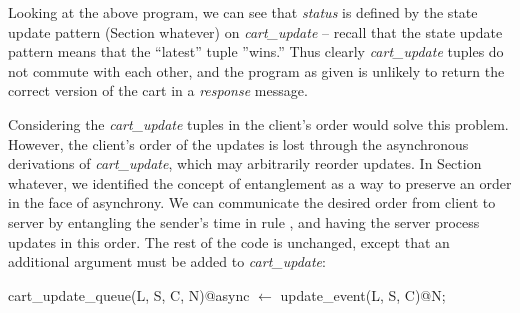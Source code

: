 Looking at the above program, we can see that {\em status} is defined by the
state update pattern (Section whatever) on {\em cart\_update} -- recall that
the state update pattern means that the ``latest'' tuple ''wins.'' Thus clearly
{\em cart\_update} tuples do not commute with each other, and the program as
given is unlikely to return the correct version of the cart in a {\em response}
message.

Considering the {\em cart\_update} tuples in the client's order would solve
this problem.  However, the client's order of the updates is lost through the
asynchronous derivations of {\em cart\_update}, which may arbitrarily reorder
updates.  In Section whatever, we identified the concept of entanglement as a
way to preserve an order in the face of asynchrony.  We can communicate the
desired order from client to server by entangling the sender's time in rule
, and having the server process updates in this order.
The rest of the code is unchanged, except that an additional argument must be
added to {\em cart\_update}:

\begin{Dedalus}
cart_update_queue(L, S, C, N)@async \(\leftarrow\)
    update_event(L, S, C)@N;
\end{Dedalus}


